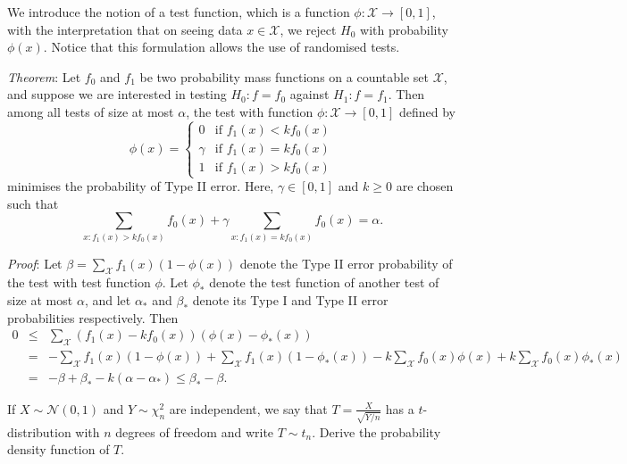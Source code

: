 We introduce the notion of a test function, which is a function $\phi:\mathcal{X}\to[0,1]$, with the interpretation that on seeing data $x\in\mathcal{X}$, we reject $H_0$ with probability $\phi(x)$. Notice that this formulation allows the use of randomised tests.

\emph{Theorem}: Let $f_0$ and $f_1$ be two probability mass functions on a countable set $\mathcal{X}$, and suppose we are interested in testing $H_0: f=f_0$ against $H_1: f=f_1$. Then among all tests of size at most $\alpha$, the test with function $\phi: \mathcal{X}\to[0,1]$ defined by
\begin{equation}
\phi(x)=\left\{
\begin{array}{cl}
0 & \text{if } f_1(x)<kf_0(x)\\
\gamma & \text{if } f_1(x) = kf_0(x)\\
1 & \text{if } f_1(x)>kf_0(x)
\end{array}
\right.
\end{equation}
minimises the probability of Type II error. Here, $\gamma\in[0,1]$ and $k\geq 0$ are chosen such that
\begin{equation}
\sum_{x:f_1(x)>kf_0(x)}f_0(x) + \gamma\sum_{x:f_1(x)=kf_0(x)}f_0(x)=\alpha.
\end{equation}

\emph{Proof}: Let $\beta=\sum_{\mathcal{X}}f_1(x)(1-\phi(x))$ denote the Type II error probability of the test with test function $\phi$. Let $\phi_*$ denote the test function of another test of size at most $\alpha$, and let $\alpha_*$ and $\beta_*$ denote its Type I and Type II error probabilities respectively. Then
\begin{eqnarray}
0 & \leq & \sum_{\mathcal{X}}(f_1(x) -kf_0(x))(\phi(x)-\phi_*(x))  \nonumber\\
& = & - \sum_{\mathcal{X}}f_1(x)(1-\phi(x)) + \sum_{\mathcal{X}}f_1(x)(1-\phi_*(x)) - k\sum_{\mathcal{X}}f_0(x)\phi(x) + k\sum_{\mathcal{X}}f_0(x)\phi_*(x) \nonumber\\
& = & -\beta + \beta_* -k(\alpha-\alpha_*)\leq \beta_*  -\beta.
\end{eqnarray}






\item If $X\sim\mathcal{N}(0,1)$ and $Y\sim\chi^2_n$ are independent, we say that $T=\frac{X}{\sqrt{Y/n}}$ has a $t$-distribution with $n$ degrees of freedom and write $T\sim t_n$. Derive the probability density function of $T$.



